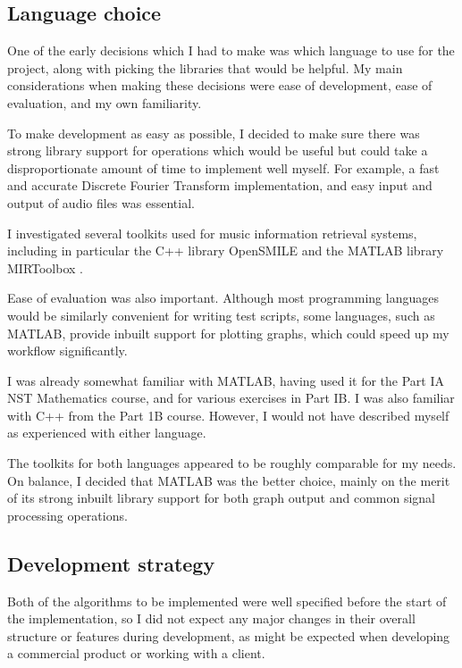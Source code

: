 \documentclass[12pt,a4paper,twoside,openright]{report}
\begin{document}
\subsection{Language choice}

One of the early decisions which I had to make was which language to use for the project, along with picking the libraries that would be helpful. My main considerations when making these decisions were ease of development, ease of evaluation, and my own familiarity.

To make development as easy as possible, I decided to make sure there was strong library support for operations which would be useful but could take a disproportionate amount of time to implement well myself. For example, a fast and accurate Discrete Fourier Transform implementation, and easy input and output of audio files was essential.

I investigated several toolkits used for music information retrieval systems, including in particular the C++ library OpenSMILE \cite{Eyben10} and the MATLAB library MIRToolbox \cite{Lartillot07}.

Ease of evaluation was also important. Although most programming languages would be similarly convenient for writing test scripts, some languages, such as MATLAB, provide inbuilt support for plotting graphs, which could speed up my workflow significantly.

I was already somewhat familiar with MATLAB, having used it for the Part IA NST Mathematics course, and for various exercises in Part IB. I was also familiar with C++ from the Part 1B course. However, I would not have described myself as experienced with either language.

The toolkits for both languages appeared to be roughly comparable for my needs. On balance, I decided that MATLAB was the better choice, mainly on the merit of its strong inbuilt library support for both graph output and common signal processing operations.


\subsection{Development strategy}
\label{section:devstrat}

Both of the algorithms to be implemented were well specified before the start of the implementation, so I did not expect any major changes in their overall structure or features during development, as might be expected when developing a commercial product or working with a client. 
\end{document}
